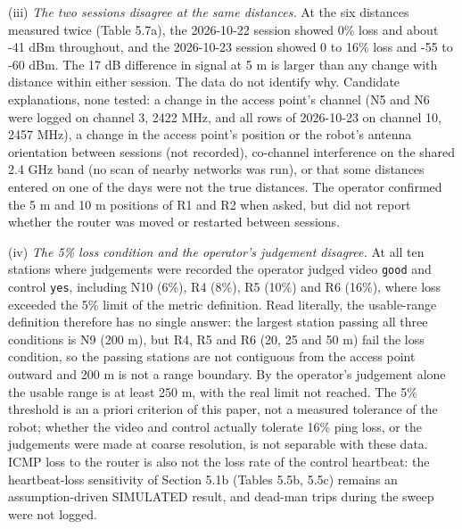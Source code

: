 (iii) \textit{The two sessions disagree at the same distances.} At the six distances measured twice (Table 5.7a), the 2026-10-22 session showed 0\% loss and about -41 dBm throughout, and the 2026-10-23 session showed 0 to 16\% loss and -55 to -60 dBm. The 17 dB difference in signal at 5 m is larger than any change with distance within either session. The data do not identify why. Candidate explanations, none tested: a change in the access point's channel (N5 and N6 were logged on channel 3, 2422 MHz, and all rows of 2026-10-23 on channel 10, 2457 MHz), a change in the access point's position or the robot's antenna orientation between sessions (not recorded), co-channel interference on the shared 2.4 GHz band (no scan of nearby networks was run), or that some distances entered on one of the days were not the true distances. The operator confirmed the 5 m and 10 m positions of R1 and R2 when asked, but did not report whether the router was moved or restarted between sessions.

(iv) \textit{The 5\% loss condition and the operator's judgement disagree.} At all ten stations where judgements were recorded the operator judged video \texttt{good} and control \texttt{yes}, including N10 (6\%), R4 (8\%), R5 (10\%) and R6 (16\%), where loss exceeded the 5\% limit of the metric definition. Read literally, the usable-range definition therefore has no single answer: the largest station passing all three conditions is N9 (200 m), but R4, R5 and R6 (20, 25 and 50 m) fail the loss condition, so the passing stations are not contiguous from the access point outward and 200 m is not a range boundary. By the operator's judgement alone the usable range is at least 250 m, with the real limit not reached. The 5\% threshold is an a priori criterion of this paper, not a measured tolerance of the robot; whether the video and control actually tolerate 16\% ping loss, or the judgements were made at coarse resolution, is not separable with these data. ICMP loss to the router is also not the loss rate of the control heartbeat: the heartbeat-loss sensitivity of Section 5.1b (Tables 5.5b, 5.5c) remains an assumption-driven SIMULATED result, and dead-man trips during the sweep were not logged.

